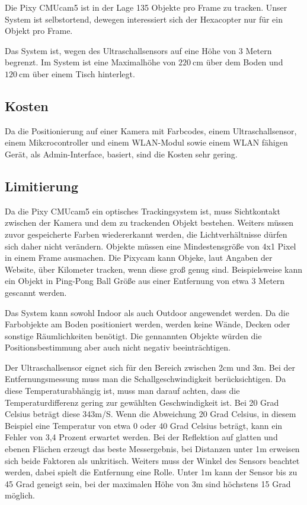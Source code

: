   Die Pixy CMUcam5 ist in der Lage 135 Objekte pro Frame\cite{PIXY_Porting_Examplecode} zu tracken. Unser System ist selbstortend, dewegen interessiert sich der Hexacopter nur für ein Objekt pro Frame. 

  Das System ist, wegen des Ultraschallsensors auf eine Höhe von 3 Metern begrenzt. Im System ist eine Maximalhöhe von $\SI{220}{\centi\metre}$ über dem Boden und $\SI{120}{\centi\metre}$ über einem Tisch hinterlegt.

  \subsection*{Kosten}
  Da  die Positionierung auf einer Kamera mit Farbcodes, einem Ultraschallsensor, einem Mikcrocontroller und einem WLAN-Modul sowie einem WLAN fähigen Gerät, als Admin-Interface, basiert, sind die Kosten sehr gering.

  \subsection*{Limitierung}
  Da die Pixy CMUcam5\cite{Pixy} ein optisches Trackingsystem ist, muss Sichtkontakt zwischen der Kamera und dem zu trackenden Objekt bestehen. Weiters müssen zuvor gespeicherte Farben wiedererkannt werden, die Lichtverhältnisse dürfen sich daher nicht verändern.
  Objekte müssen eine Mindestensgröße von 4x1 Pixel in einem Frame ausmachen. Die Pixycam kann Objeke, laut Angaben der Website, über Kilometer tracken, wenn diese groß genug sind. Beispielsweise kann ein Objekt in Ping-Pong Ball Größe aus einer Entfernung von etwa 3 Metern gescannt werden. 

  Das System kann sowohl Indoor als auch Outdoor angewendet werden. Da die Farbobjekte am Boden positioniert werden, werden keine Wände, Decken oder sonstige Räumlichkeiten benötigt. Die gennannten Objekte würden die Positionsbestimmung aber auch nicht negativ beeinträchtigen.

  Der Ultraschallsensor\cite{Ultrasonic} eignet sich für den Bereich zwischen 2cm und 3m. Bei der Entfernungsmessung muss man die Schallgeschwindigkeit berücksichtigen. Da diese Temperaturabhängig ist, muss man darauf achten, dass die Temperaturdifferenz gering zur gewählten Geschwindigkeit ist. Bei 20 Grad Celsius beträgt diese 343m/S. Wenn die Abweichung 20 Grad Celsius, in diesem Beispiel eine Temperatur von etwa 0 oder 40 Grad Celsius beträgt, kann ein Fehler von 3,4 Prozent erwartet werden.
  Bei der Reflektion auf glatten und ebenen Flächen erzeugt das beste Messergebnis, bei Distanzen unter 1m erweisen sich beide Faktoren als unkritisch.
  Weiters muss der Winkel des Sensors beachtet werden, dabei spielt die Entfernung eine Rolle. Unter 1m kann der Sensor bis zu 45 Grad geneigt sein, bei der maximalen Höhe von 3m sind höchstens 15 Grad möglich. 
